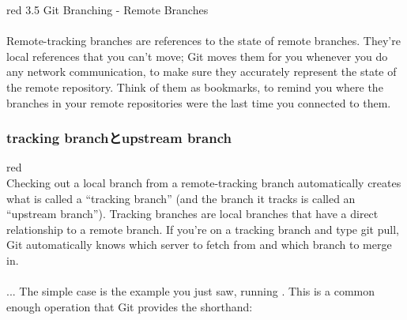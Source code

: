 \documentclass[11pt,a4paper,openany,dvipdfmx]{jsarticle}
\begin{document}
\begin{ColorReferenceBox}{red}
3.5 Git Branching - Remote Branches\\
\\
Remote-tracking branches are references to the state of remote branches. They’re local references that you can’t move; Git moves them for you whenever you do any network communication, to make sure they accurately represent the state of the remote repository. Think of them as bookmarks, to remind you where the branches in your remote repositories were the last time you connected to them.\\

\end{ColorReferenceBox}

\subsubsection{tracking branchとupstream branch} %
\label{ssub:tracking_branchとupstream_branch}


\begin{ColorReferenceBox}{red}
\\
Checking out a local branch from a remote-tracking branch automatically creates what is called a “tracking branch” (and the branch it tracks is called an “upstream branch”). Tracking branches are local branches that have a direct relationship to a remote branch. If you’re on a tracking branch and type git pull, Git automatically knows which server to fetch from and which branch to merge in.\\
\\
... The simple case is the example you just saw, running . This is a common enough operation that Git provides the   shorthand:
\end{ColorReferenceBox}
\end{document}
